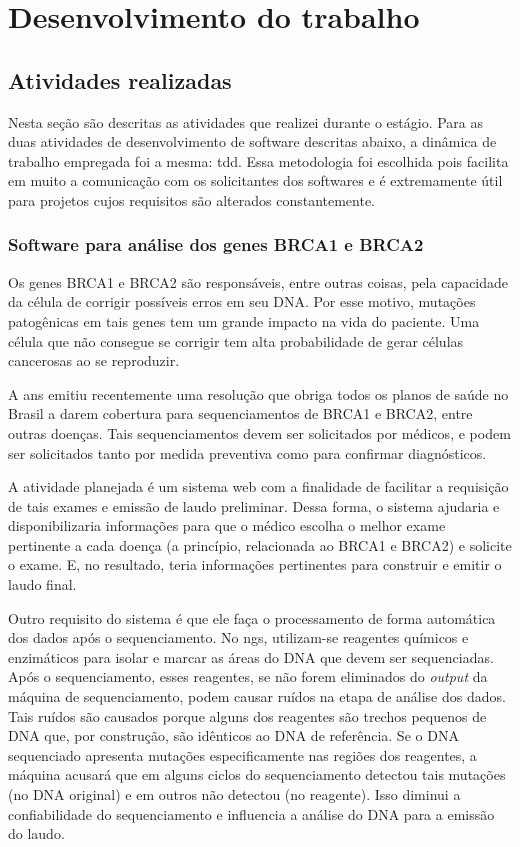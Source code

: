 \chapter{Desenvolvimento do trabalho}
\label{chap:atividadesRealizadas}


\section{Atividades realizadas}

Nesta seção são descritas as atividades que realizei durante o estágio. Para as duas atividades de desenvolvimento de software descritas abaixo,
a dinâmica de trabalho empregada foi a mesma: \gls{tdd}. Essa metodologia foi escolhida pois facilita em muito a comunicação com os solicitantes
dos softwares e é extremamente útil para projetos cujos requisitos são alterados constantemente.

\subsection{Software para análise dos genes BRCA1 e BRCA2}

Os genes BRCA1 e BRCA2 são responsáveis, entre outras coisas, pela capacidade da célula de corrigir possíveis erros em
seu DNA. Por esse motivo, mutações patogênicas em tais genes tem um grande impacto na vida do paciente. Uma célula que
não consegue se corrigir tem alta probabilidade de gerar células cancerosas ao se reproduzir.

A \gls{ans} emitiu recentemente uma resolução que obriga todos os planos de saúde no Brasil a darem cobertura para
sequenciamentos de BRCA1 e BRCA2, entre outras doenças. Tais sequenciamentos devem ser solicitados por médicos, e podem ser solicitados
tanto por medida preventiva como para confirmar diagnósticos.

A atividade planejada é um sistema web com a finalidade de facilitar a requisição de tais exames e emissão de laudo preliminar.
Dessa forma, o sistema ajudaria e disponibilizaria informações para que o médico escolha o melhor exame pertinente a cada doença (a princípio,
relacionada ao BRCA1 e BRCA2) e solicite o exame. E, no resultado, teria informações pertinentes para construir e emitir o laudo final.

Outro requisito do sistema é que ele faça o processamento de forma automática dos dados após o sequenciamento. No \gls{ngs}, utilizam-se
reagentes químicos e enzimáticos para isolar e marcar as áreas do DNA que devem ser sequenciadas. Após o sequenciamento, esses reagentes, se
não forem eliminados do \textit{output} da máquina de sequenciamento, podem causar ruídos na etapa de análise dos dados. Tais ruídos
são causados porque alguns dos reagentes são trechos pequenos de DNA que, por construção, são idênticos ao DNA de referência. Se o DNA
sequenciado apresenta mutações especificamente nas regiões dos reagentes, a máquina acusará que em alguns ciclos do sequenciamento detectou
tais mutações (no DNA original) e em outros não detectou (no reagente). Isso diminui a confiabilidade do sequenciamento e influencia
a análise do DNA para a emissão do laudo.

